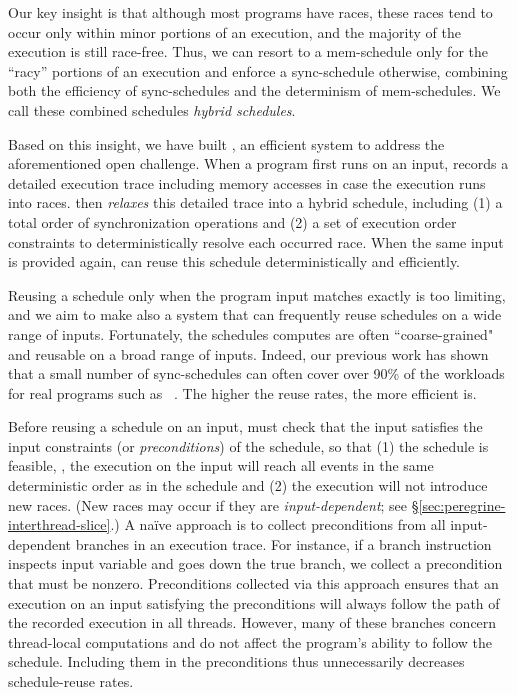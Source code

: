 Our key insight is that although most programs have races, these races
tend to occur only within minor portions of an execution, and the majority
of the execution is still race-free.  Thus, we can resort to a
mem-schedule only for the ``racy'' portions of an execution and enforce a
sync-schedule otherwise, combining both the efficiency of sync-schedules
and the determinism of mem-schedules. We call these combined schedules
\emph{hybrid schedules}.

Based on this insight, we have built \peregrine, an efficient \dmt
system to address the aforementioned open challenge.
When a program first runs on an input, \peregrine records a detailed execution
trace including memory accesses in case the execution runs into races.
\peregrine then \emph{relaxes} this detailed trace into a hybrid schedule,
including (1) a total order of synchronization operations and (2) a set of
execution order constraints to deterministically resolve each occurred race. 
When the same input is provided again, \peregrine can reuse this schedule
deterministically and efficiently.

Reusing a schedule only when the program input matches exactly is too
limiting, and we aim to make \peregrine also a \smt system that can frequently
reuse schedules on a wide range of inputs.  Fortunately, the schedules
\peregrine computes are often
``coarse-grained" and reusable on a broad range of inputs.  Indeed, our
previous work has shown that a small number of sync-schedules can often cover
over 90\% of the workloads for real programs such as
\apache~\cite{cui:tern:osdi10}.  The higher the reuse rates, the more efficient
\peregrine is.


Before reusing a schedule on an input, \peregrine must check that the input
satisfies the input constraints (or \emph{preconditions}) of the schedule, so
that (1) the schedule is feasible, \ie, the execution on the input will reach
all events in the same deterministic order as in the schedule and (2) the
execution will not introduce new races. (New races may occur if they are
\emph{input-dependent}; see \S\ref{sec:peregrine-interthread-slice}.)  A na\"ive
approach is to collect preconditions from all input-dependent branches in
an execution trace.  For instance, if a branch instruction inspects
input variable  and goes down the true branch, we collect a
precondition that  must be nonzero.  Preconditions collected via
this approach ensures that an execution on an input satisfying the
preconditions will always follow the path of the recorded execution in all
threads.  However, many of these branches concern thread-local
computations and do not affect the program's ability to follow the
schedule. Including them in the preconditions thus unnecessarily decreases
schedule-reuse rates.

